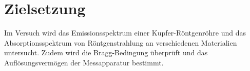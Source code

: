 
\section{Zielsetzung}
\label{sec:Zielsetzung}

Im Versuch wird das Emissionsspektrum einer Kupfer-Röntgenröhre und das Absorptionsspektrum von Röntgenstrahlung an verschiedenen Materialien untersucht. Zudem wird die Bragg-Bedingung überprüft und das Auflösungsvermögen der Messapparatur bestimmt. 